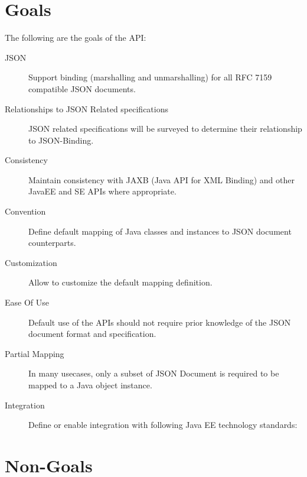 \section{Goals}

The following are the goals of the API:

\begin{description}

\item[JSON] 
Support binding (marshalling and unmarshalling) for all RFC 7159 compatible JSON documents.

\item [Relationships to JSON Related specifications]
JSON related specifications will be surveyed to determine their relationship to JSON-Binding.

\item[Consistency] 
Maintain consistency with JAXB (Java API for XML Binding) and other JavaEE and SE APIs where appropriate.

\item[Convention] 
Define default mapping of Java classes and instances to JSON document counterparts.

\item[Customization] 
Allow to customize the default mapping definition.

\item[Ease Of Use] 
Default use of the APIs should not require prior knowledge of the JSON document format and specification.

\item[Partial Mapping] 
In many usecases, only a subset of JSON Document is required to be mapped to a Java object  instance.

\item[Integration]
Define or enable integration with following Java EE technology standards:
  
\end{description}

\section{Non-Goals}
\label{non_goals}

